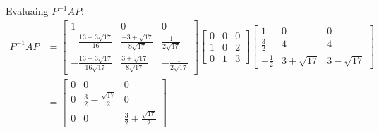 \documentclass[11pt]{homework}
\begin{document}
Evaluaing $P^{-1}AP$:
\begin{align*}
P^{-1}AP &= 
  \begin{bmatrix}
    1                         & 0 & 0 \\
    -\frac{13-3\sqrt{17}}{16} & \frac{-3 + \sqrt{17}}{8\sqrt{17}} & \frac{1}{2\sqrt{17}} \\
    -\frac{13+3\sqrt{17}}{16\sqrt{17}} & \frac{3+\sqrt{17}}{8\sqrt{17}} & -\frac{1}{2\sqrt{17}}
  \end{bmatrix}
  \begin{bmatrix}
    0 & 0 & 0 \\
    1 & 0 & 2 \\
    0 & 1 & 3 
  \end{bmatrix}
  \begin{bmatrix}
    1            & 0             & 0             \\
    \frac{3}{2}  & 4             & 4              \\
    -\frac{1}{2} & 3 + \sqrt{17} & 3 - \sqrt{17} 
  \end{bmatrix} \\
  &=
  \begin{bmatrix}
    0 & 0 & 0 \\
    0 & \frac{3}{2} - \frac{\sqrt{17}}{2} & 0 \\
    0 & 0 & \frac{3}{2} + \frac{\sqrt{17}}{2}
  \end{bmatrix}
\end{align*}
\end{document}
